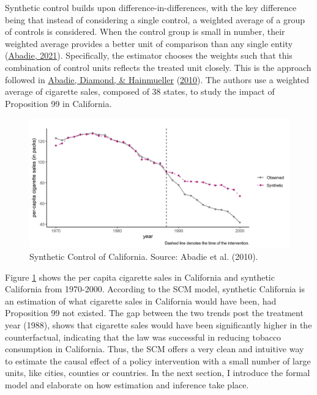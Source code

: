 \documentclass[12pt,nobind, a4paper]{reedthesis}
\begin{document}
 Synthetic control builds upon difference-in-differences, with the key difference being that instead of considering a single control, a weighted average of a group of controls is considered. When the control group is small in number, their weighted average provides a better unit of comparison than any single entity (\protect\hyperlink{ref-abadie_using_2021}{Abadie, 2021}). Specifically, the estimator chooses the weights such that this combination of control units reflects the treated unit closely. This is the approach followed in \protect\hyperlink{ref-abadie_synthetic_2010}{Abadie, Diamond, \& Hainmueller} (\protect\hyperlink{ref-abadie_synthetic_2010}{2010}). The authors use a weighted average of cigarette sales, composed of 38 states, to study the impact of Proposition 99 in California.
 \begin{figure}

 {\centering \includegraphics[width=1\linewidth]{figure/caltrends} 

 }

 \caption{Synthetic Control of California. Source: Abadie et al. (2010).}\label{fig:prop}
 \end{figure}
 Figure \ref{fig:prop} shows the per capita cigarette sales in California and synthetic California from 1970-2000. According to the SCM model, synthetic California is an estimation of what cigarette sales in California would have been, had Proposition 99 not existed. The gap between the two trends post the treatment year (1988), shows that cigarette sales would have been significantly higher in the counterfactual, indicating that the law was successful in reducing tobacco consumption in California. Thus, the SCM offers a very clean and intuitive way to estimate the causal effect of a policy intervention with a small number of large units, like cities, counties or countries. In the next section, I introduce the formal model and elaborate on how estimation and inference take place.
\end{document}
